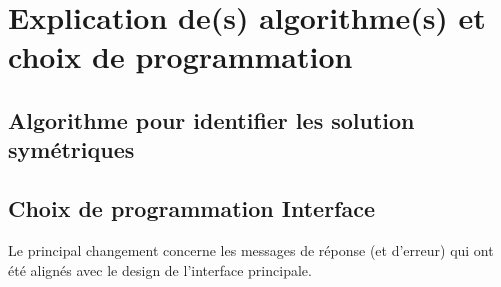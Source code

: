 \section{Explication de(s) algorithme(s) et choix de programmation}

\subsection{Algorithme pour identifier les solution symétriques}

\subsection{Choix de programmation Interface}

Le principal changement concerne les messages de réponse (et d’erreur) qui ont été alignés avec le design de l’interface principale.

